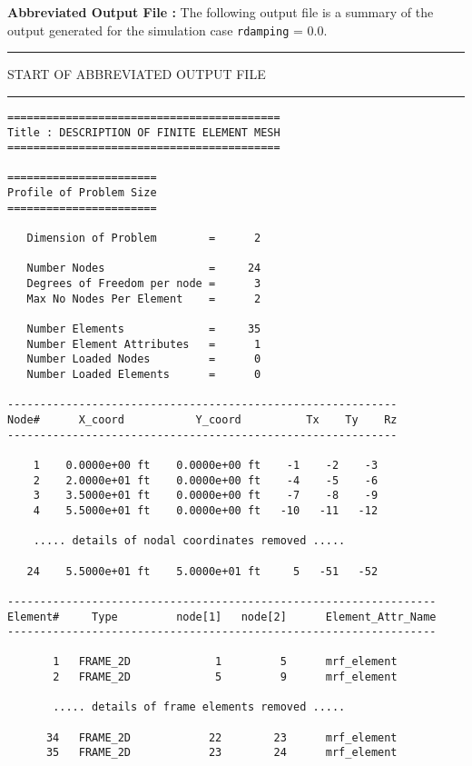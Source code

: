 \vspace{0.15 in}\noindent
{\bf Abbreviated Output File :} The following output file is a summary
of the output generated for the simulation case {\tt rdamping} = 0.0. 

\vspace{0.20 truein}
\begin{footnotesize}
\noindent
{\rule{1.7 in}{0.035 in} START OF ABBREVIATED OUTPUT FILE \rule{1.7 in}{0.035 in} }
\begin{verbatim}
==========================================
Title : DESCRIPTION OF FINITE ELEMENT MESH                                 
==========================================

=======================
Profile of Problem Size
=======================

   Dimension of Problem        =      2

   Number Nodes                =     24
   Degrees of Freedom per node =      3
   Max No Nodes Per Element    =      2

   Number Elements             =     35
   Number Element Attributes   =      1
   Number Loaded Nodes         =      0
   Number Loaded Elements      =      0

------------------------------------------------------------
Node#      X_coord           Y_coord          Tx    Ty    Rz  
------------------------------------------------------------

    1    0.0000e+00 ft    0.0000e+00 ft    -1    -2    -3 
    2    2.0000e+01 ft    0.0000e+00 ft    -4    -5    -6 
    3    3.5000e+01 ft    0.0000e+00 ft    -7    -8    -9 
    4    5.5000e+01 ft    0.0000e+00 ft   -10   -11   -12 

    ..... details of nodal coordinates removed .....

   24    5.5000e+01 ft    5.0000e+01 ft     5   -51   -52 

------------------------------------------------------------------
Element#     Type         node[1]   node[2]      Element_Attr_Name
------------------------------------------------------------------

       1   FRAME_2D             1         5      mrf_element
       2   FRAME_2D             5         9      mrf_element

       ..... details of frame elements removed .....

      34   FRAME_2D            22        23      mrf_element
      35   FRAME_2D            23        24      mrf_element


\end{verbatim}
\end{footnotesize}
